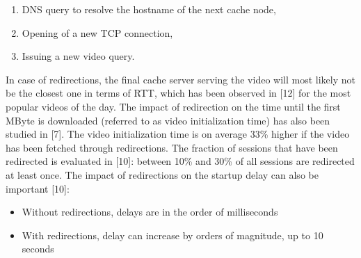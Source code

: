 \begin{enumerate}
  \item DNS query to resolve the hostname of the next cache node,
  \item Opening of a new TCP connection,
  \item Issuing a new video query.
\end{enumerate}

In case of redirections, the final cache server serving the video will most likely not be the closest one in terms of RTT, which has been observed in [12] for the most popular videos of the day. The impact of redirection on the time until the first MByte is downloaded (referred to as video initialization time) has also been studied in [7]. The video initialization time is on average 33\% higher if the video has been fetched through redirections. The fraction of sessions that have been redirected is evaluated in [10]: between 10\% and 30\% of all sessions are redirected at least once. The impact of redirections on the startup delay can also be important [10]:

\begin{itemize}
  \item Without redirections, delays are in the order of milliseconds
  \item With redirections, delay can increase by orders of magnitude, up to 10 seconds
\end{itemize}

